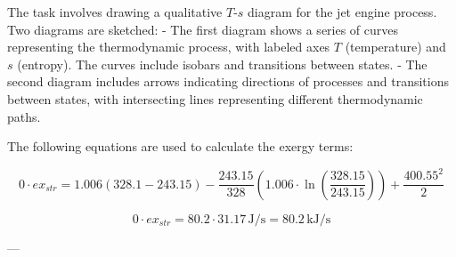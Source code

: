 The task involves drawing a qualitative \( T \)-\( s \) diagram for the jet engine process. Two diagrams are sketched:  
- The first diagram shows a series of curves representing the thermodynamic process, with labeled axes \( T \) (temperature) and \( s \) (entropy). The curves include isobars and transitions between states.  
- The second diagram includes arrows indicating directions of processes and transitions between states, with intersecting lines representing different thermodynamic paths.

The following equations are used to calculate the exergy terms:  

\[
0 \cdot ex_{str} = 1.006 (328.1 - 243.15) - \frac{243.15}{328} \left( 1.006 \cdot \ln \left( \frac{328.15}{243.15} \right) \right) + \frac{400.55^2}{2}
\]

\[
0 \cdot ex_{str} = 80.2 \cdot 31.17 \, \text{J/s} = 80.2 \, \text{kJ/s}
\]

---